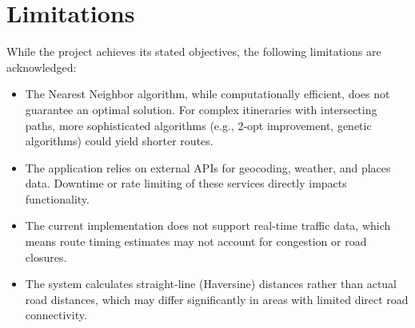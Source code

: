\section{Limitations}
While the project achieves its stated objectives, the following limitations are acknowledged:
\begin{itemize}
    \item The Nearest Neighbor algorithm, while computationally efficient, does not guarantee an optimal solution. For complex itineraries with intersecting paths, more sophisticated algorithms (e.g., 2-opt improvement, genetic algorithms) could yield shorter routes.
    \item The application relies on external APIs for geocoding, weather, and places data. Downtime or rate limiting of these services directly impacts functionality.
    \item The current implementation does not support real-time traffic data, which means route timing estimates may not account for congestion or road closures.
    \item The system calculates straight-line (Haversine) distances rather than actual road distances, which may differ significantly in areas with limited direct road connectivity.
\end{itemize}

